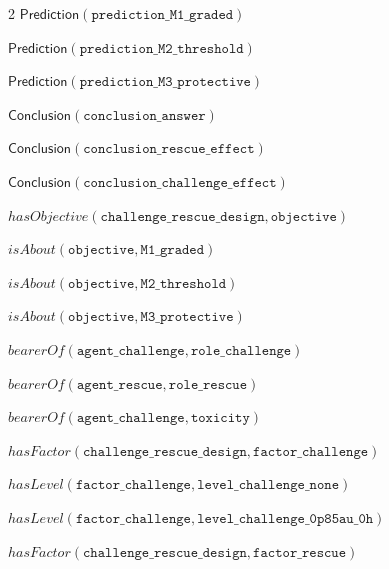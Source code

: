 \documentclass[10pt,a4paper]{article}
\begin{document}
{\begin{multicols}{2}
$\mathsf{Prediction}(\mathtt{prediction\_\allowbreak{}\allowbreak{}M1\_\allowbreak{}\allowbreak{}graded})$\par
$\mathsf{Prediction}(\mathtt{prediction\_\allowbreak{}\allowbreak{}M2\_\allowbreak{}\allowbreak{}threshold})$\par
$\mathsf{Prediction}(\mathtt{prediction\_\allowbreak{}\allowbreak{}M3\_\allowbreak{}\allowbreak{}protective})$\par
$\mathsf{Conclusion}(\mathtt{conclusion\_\allowbreak{}\allowbreak{}answer})$\par
$\mathsf{Conclusion}(\mathtt{conclusion\_\allowbreak{}\allowbreak{}rescue\_\allowbreak{}\allowbreak{}effect})$\par
$\mathsf{Conclusion}(\mathtt{conclusion\_\allowbreak{}\allowbreak{}challenge\_\allowbreak{}\allowbreak{}effect})$\par
$\mathit{hasObjective}(\mathtt{challenge\_\allowbreak{}\allowbreak{}rescue\_\allowbreak{}\allowbreak{}design}, \mathtt{objective})$\par
$\mathit{isAbout}(\mathtt{objective}, \mathtt{M1\_\allowbreak{}\allowbreak{}graded})$\par
$\mathit{isAbout}(\mathtt{objective}, \mathtt{M2\_\allowbreak{}\allowbreak{}threshold})$\par
$\mathit{isAbout}(\mathtt{objective}, \mathtt{M3\_\allowbreak{}\allowbreak{}protective})$\par
$\mathit{bearerOf}(\mathtt{agent\_\allowbreak{}\allowbreak{}challenge}, \mathtt{role\_\allowbreak{}\allowbreak{}challenge})$\par
$\mathit{bearerOf}(\mathtt{agent\_\allowbreak{}\allowbreak{}rescue}, \mathtt{role\_\allowbreak{}\allowbreak{}rescue})$\par
$\mathit{bearerOf}(\mathtt{agent\_\allowbreak{}\allowbreak{}challenge}, \mathtt{toxicity})$\par
$\mathit{hasFactor}(\mathtt{challenge\_\allowbreak{}\allowbreak{}rescue\_\allowbreak{}\allowbreak{}design}, \mathtt{factor\_\allowbreak{}\allowbreak{}challenge})$\par
$\mathit{hasLevel}(\mathtt{factor\_\allowbreak{}\allowbreak{}challenge}, \mathtt{level\_\allowbreak{}\allowbreak{}challenge\_\allowbreak{}\allowbreak{}none})$\par
$\mathit{hasLevel}(\mathtt{factor\_\allowbreak{}\allowbreak{}challenge}, \mathtt{level\_\allowbreak{}\allowbreak{}challenge\_\allowbreak{}\allowbreak{}0p85au\_\allowbreak{}\allowbreak{}0h})$\par
$\mathit{hasFactor}(\mathtt{challenge\_\allowbreak{}\allowbreak{}rescue\_\allowbreak{}\allowbreak{}design}, \mathtt{factor\_\allowbreak{}\allowbreak{}rescue})$\par

\end{multicols}}
\end{document}
